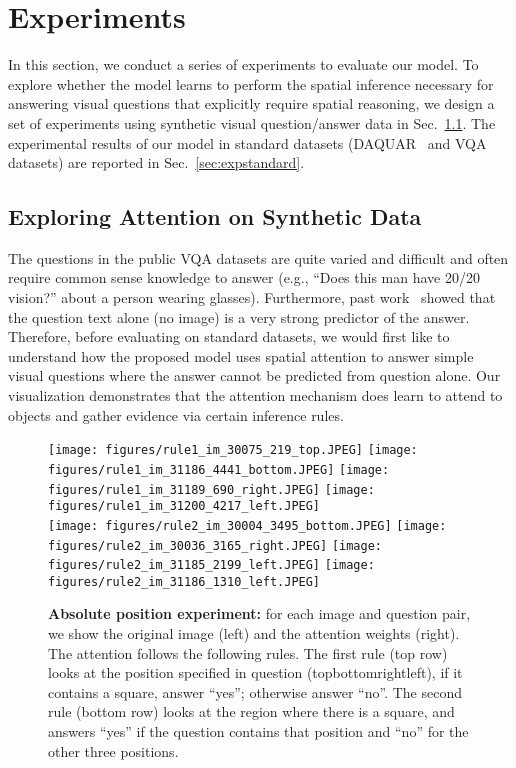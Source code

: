 \section{Experiments}
\vspace{-0.05in}

In this section, we conduct a series of experiments to evaluate our model. 
To explore whether the model learns to perform the spatial inference necessary for answering visual questions that explicitly require spatial reasoning, we design a set of experiments using synthetic visual question/answer data in Sec.~\ref{sec:synthetic1}. The experimental results of our model in standard datasets (DAQUAR~\cite{DBLP:journals/corr/MalinowskiF14} and VQA~\cite{DBLP:journals/corr/AntolALMBZP15} datasets) are reported in Sec.~\ref{sec:expstandard}.

\subsection{Exploring Attention on Synthetic Data}\label{sec:synthetic1}
The questions in the public VQA datasets are quite varied and difficult and often require common sense knowledge to answer (e.g., ``Does this man have 20/20 vision?'' about a person wearing glasses). Furthermore, past work~\cite{malinowski2015ask,DBLP:journals/corr/RenKZ15} showed that the question text alone (no image) is a very strong predictor of the answer.
Therefore, before evaluating on standard datasets, we would first like to
understand how the proposed model uses spatial attention to answer simple visual questions where the answer cannot be predicted from question alone. 
Our visualization demonstrates that the attention mechanism does learn to attend to objects and gather evidence via certain inference rules. 

\begin{figure*}[!t]
  \texttt{[image: figures/rule1\_im\_30075\_219\_top.JPEG]}
  \texttt{[image: figures/rule1\_im\_31186\_4441\_bottom.JPEG]}
  \texttt{[image: figures/rule1\_im\_31189\_690\_right.JPEG]}
  \texttt{[image: figures/rule1\_im\_31200\_4217\_left.JPEG]}\\
  \texttt{[image: figures/rule2\_im\_30004\_3495\_bottom.JPEG]}
  \texttt{[image: figures/rule2\_im\_30036\_3165\_right.JPEG]}
  \texttt{[image: figures/rule2\_im\_31185\_2199\_left.JPEG]}
  \texttt{[image: figures/rule2\_im\_31186\_1310\_left.JPEG]}
\vspace{-0.1in}
\caption{\textbf{Absolute position experiment:} for each image and question pair, we show the original image (left) and the attention weights  (right). 
The attention follows the following rules. The first rule (top row) looks at the position specified in question (topbottomrightleft), if it contains a square, answer ``yes''; otherwise answer ``no''.
The second rule (bottom row) looks at the region where there is a square, and answers ``yes'' if the question contains that position and ``no'' for the other three positions.}\label{fig:red_square}
\vspace{-0.1in}
\end{figure*}


